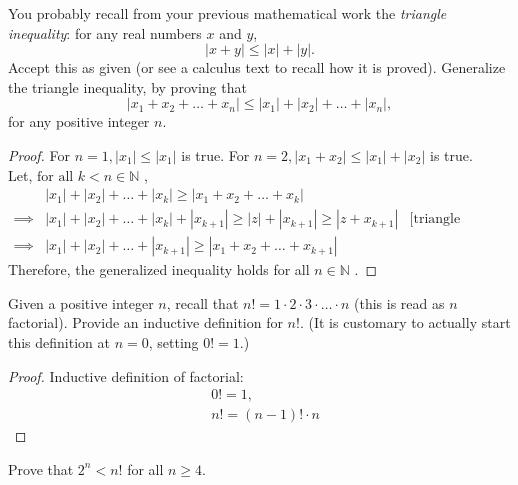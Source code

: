 \documentclass[12pt]{article}
\newenvironment{problem}[2][Problem]{\begin{trivlist}
\item[\hskip \labelsep {\bfseries #1}\hskip \labelsep {\bfseries #2.}]}{\end{trivlist}}
\begin{document}
\begin{problem}{3}
    You probably recall from your previous mathematical work the \textit{triangle inequality}: 
for any real numbers \( x \) and \( y \),
\[
|x + y| \leq |x| + |y|.
\]
Accept this as given (or see a calculus text to recall how it is proved). Generalize the triangle inequality, by proving that
\[
|x_1 + x_2 + \dots + x_n| \leq |x_1| + |x_2| + \dots + |x_n|,
\]
for any positive integer \( n \).

\end{problem}

\begin{proof}
For $n = 1, |x_1| \leq |x_1|$ is true. 
For $n = 2, |x_1 + x_2| \leq |x_1| + |x_2|$ is true. \\
Let, $\text{for all } k < n \in \mathbb{N}$ ,
\begin{align*}
   & |x_1| + |x_2| + \dots + |x_k| \geq |x_1 + x_2 + \dots + x_k| \\
   \implies & |x_1| + |x_2| + \dots + |x_k| + |x_ {k+1}|\geq |z| + |x_{k+1}| \geq |z + x_{k+1}| & \text{[triangle inequality]} \\
   \implies & |x_1| + |x_2| + \dots  + |x_ {k+1}| \geq |x_1 + x_2 + \dots + x_{k+1}|
\end{align*}
Therefore, the generalized inequality holds for all $n \in \mathbb{N}$ .

\end{proof}

\begin{problem}{4}
    Given a positive integer \( n \), recall that \( n! = 1 \cdot 2 \cdot 3 \cdot \dots \cdot n \) (this is read as \( n \) factorial).
Provide an inductive definition for \( n! \). (It is customary to actually start this definition
at \( n = 0 \), setting \( 0! = 1 \).)

\end{problem}

\begin{proof}
Inductive definition of factorial:
\begin{align*}
    & 0! = 1, \\
& n! = (n-1)! \cdot n
\end{align*}

\end{proof}

\begin{problem}{5}
Prove that \( 2^n < n! \) for all \( n \geq 4 \).

\end{problem}
\end{document}
